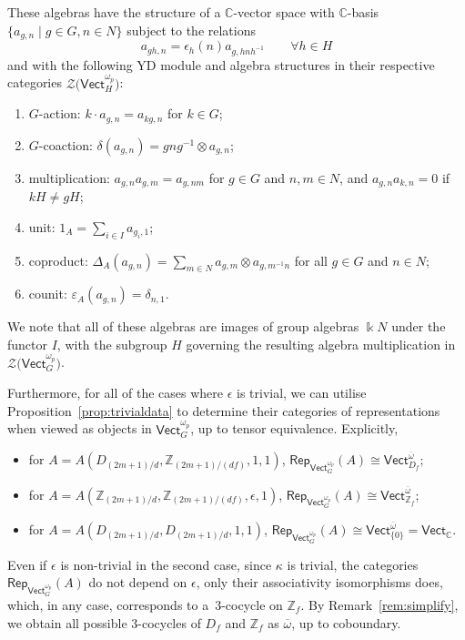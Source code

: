 \documentclass[pdftex]{sigma}
\numberwithin{equation}{section}
\newcommand{\ov}[1]{\overline{#1}}
\newcommand{\Rep}{\mathsf{Rep}}
\newcommand{\Vect}{\mathsf{Vect}}
\newcommand{\mC}{\mathbb{C}}
\newcommand{\mZ}{\mathbb{Z}}
\newcommand{\cZ}{\mathcal{Z}}
\begin{document}
These algebras have the structure of
 a $\mC$-vector space with $\mC$-basis ${\lbrace a_{g,n} \mid g \in G, \allowbreak n \in N\rbrace}$ subject to the relations
 \[a_{gh,n} = \epsilon_h(n) a_{g,hnh^{-1}} \qquad \forall h\in H\]
 and with
the following YD module and algebra structures in their respective categories $\cZ\big(\Vect^{\omega_p}_H\big)$:
 \begin{enumerate}\itemsep=0pt
 \item[$(i)$] $G$-action: $k \cdot a_{g,n}=a_{kg,n}$ for $k\in G$;
 \item[$(ii)$] $G$-coaction: $\delta(a_{g,n})=gng^{-1} \otimes a_{g,n}$;
 \item[$(iii)$] multiplication: $a_{g,n} a_{g,m} = a_{g,nm}$ for $g \in G$ and $ n,m\in N$, and $a_{g,n}a_{k,n} =0$ if $kH\neq gH$;
 \item[$(iv)$] unit: $1_A =\sum_{i\in I}a_{g_i,1}$;
 \item[$(v)$] coproduct: $\Delta_A (a_{g,n}) = \sum_{m\in N}a_{g,m}\otimes a_{g,m^{-1}n}$ for all $g\in G$ and $n\in N$;
 \item[$(vi)$] counit:
 $\varepsilon_A(a_{g,n}) = \delta_{n,1}.$
 \end{enumerate}
 We note that all of these algebras are images of group algebras $\Bbbk N$ under the functor $I$, with the subgroup $H$ governing the resulting algebra multiplication in $\cZ\big(\Vect_G^{\omega_p}\big)$.

Furthermore, for all of the cases where $\epsilon$ is trivial, we can utilise Proposition~\ref{prop:trivialdata} to determine their categories of representations when viewed as objects in $\Vect_G^{\omega_p}$, up to tensor equivalence. Explicitly,
\begin{itemize}\itemsep=0pt
 \item for $A=A(D_{(2m+1)/d},\mZ_{(2m+1)/(df)},1,1)$, $\Rep_{\Vect_G^{\omega_p}}(A) \cong \Vect^{\ov{\omega}}_{D_f}$;
 \item for $A=A(\mZ_{(2m+1)/d},\mZ_{(2m+1)/(df)},\epsilon,1)$, $\Rep_{\Vect_G^{\omega_p}}(A) \cong \Vect^{\ov{\omega}}_{\mZ_f}$;
 \item for $A=A(D_{(2m+1)/d},D_{(2m+1)/d},1,1)$, $\Rep_{\Vect_G^{\omega_p}}(A) \cong \Vect^{\ov{\omega}}_{\lbrace 0\rbrace} = \Vect_\mC$.
\end{itemize}
 Even if $\epsilon$ is non-trivial in the second case, since $\kappa$ is trivial, the categories
 $\Rep_{\Vect_G^{\omega_p}}(A)$ do not depend on $\epsilon$, only their associativity isomorphisms does, which, in any case, corresponds to a~$3$-cocycle on $\mZ_f$. By Remark~\ref{rem:simplify}, we obtain all possible $3$-cocycles of $D_f$ and $\mZ_f$ as $\ov{\omega}$, up to coboundary.
\end{document}
